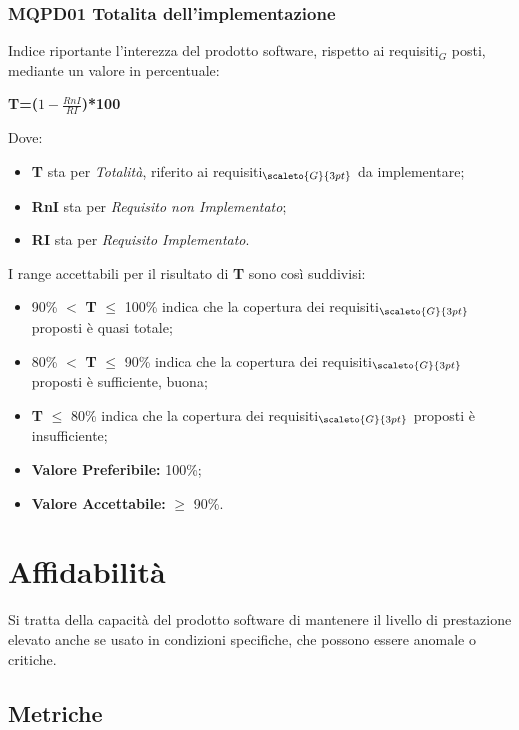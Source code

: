 \subsubsection{MQPD01 Totalita dell’implementazione} \label{QualitàDelProdottoFunzionalitàMetricheMQPD01}
Indice riportante l’interezza del prodotto software, rispetto ai requisiti$_G$ posti, mediante un valore in percentuale:
\begin{center}
	\textbf{T=($1-\frac{RnI}{RI}$)*100}
\end{center}
Dove:
\begin{itemize}
	\item \textbf{T} sta per \textit{Totalità}, riferito ai requisiti$_{\scaleto{G}{3pt}}$ da implementare;
	\item \textbf{RnI} sta per \textit{Requisito non Implementato};
	\item \textbf{RI} sta per \textit{Requisito Implementato}.
\end{itemize}
I range accettabili per il risultato di \textbf{T} sono così suddivisi:
\begin{itemize}
	\item 90\% $<$ \textbf{T} $\leq$ 100\% indica che la copertura dei requisiti$_{\scaleto{G}{3pt}}$ proposti è quasi totale;
	\item 80\% $<$ \textbf{T} $\leq$ 90\% indica che la copertura dei requisiti$_{\scaleto{G}{3pt}}$ proposti è sufficiente, buona;
	\item \textbf{T} $\leq$ 80\% indica che la copertura dei requisiti$_{\scaleto{G}{3pt}}$ proposti è insufficiente;
	\item \textbf{Valore Preferibile:} 100\%;
	\item \textbf{Valore  Accettabile:} $\geq$ 90\%. 
\end{itemize}

\section{Affidabilità} \label{QualitàDelProdottoAffidabilità}
Si tratta della capacità del prodotto software di mantenere il livello di prestazione elevato anche se usato in condizioni specifiche, che possono essere anomale o critiche. 
\subsection{Metriche} \label{QualitàDelProdottoAffidabilitàMetriche}
